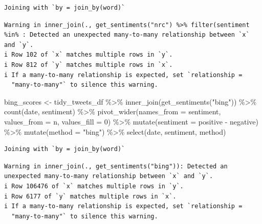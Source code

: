 \documentclass[
  letterpaper,
  DIV=11,
  numbers=noendperiod]{scrreprt}
\newenvironment{Shaded}{\begin{snugshade}}{\end{snugshade}}
\newcommand{\AttributeTok}[1]{\textcolor[rgb]{0.40,0.45,0.13}{#1}}
\newcommand{\DecValTok}[1]{\textcolor[rgb]{0.68,0.00,0.00}{#1}}
\newcommand{\FunctionTok}[1]{\textcolor[rgb]{0.28,0.35,0.67}{#1}}
\newcommand{\NormalTok}[1]{\textcolor[rgb]{0.00,0.23,0.31}{#1}}
\newcommand{\OtherTok}[1]{\textcolor[rgb]{0.00,0.23,0.31}{#1}}
\newcommand{\SpecialCharTok}[1]{\textcolor[rgb]{0.37,0.37,0.37}{#1}}
\newcommand{\StringTok}[1]{\textcolor[rgb]{0.13,0.47,0.30}{#1}}
\begin{document}
\begin{verbatim}
Joining with `by = join_by(word)`
\end{verbatim}

\begin{verbatim}
Warning in inner_join(., get_sentiments("nrc") %>% filter(sentiment %in% : Detected an unexpected many-to-many relationship between `x` and `y`.
i Row 102 of `x` matches multiple rows in `y`.
i Row 812 of `y` matches multiple rows in `x`.
i If a many-to-many relationship is expected, set `relationship =
  "many-to-many"` to silence this warning.
\end{verbatim}

\begin{Shaded}
\begin{Highlighting}[]
\NormalTok{bing\_scores }\OtherTok{\textless{}{-}}\NormalTok{ tidy\_tweets\_df }\SpecialCharTok{\%\textgreater{}\%}
  \FunctionTok{inner\_join}\NormalTok{(}\FunctionTok{get\_sentiments}\NormalTok{(}\StringTok{"bing"}\NormalTok{)) }\SpecialCharTok{\%\textgreater{}\%}
  \FunctionTok{count}\NormalTok{(date, sentiment) }\SpecialCharTok{\%\textgreater{}\%} 
   \FunctionTok{pivot\_wider}\NormalTok{(}\AttributeTok{names\_from =}\NormalTok{ sentiment,}
              \AttributeTok{values\_from =}\NormalTok{ n,}
              \AttributeTok{values\_fill =} \DecValTok{0}\NormalTok{) }\SpecialCharTok{\%\textgreater{}\%} 
  \FunctionTok{mutate}\NormalTok{(}\AttributeTok{sentiment =}\NormalTok{ positive }\SpecialCharTok{{-}}\NormalTok{ negative) }\SpecialCharTok{\%\textgreater{}\%} 
    \FunctionTok{mutate}\NormalTok{(}\AttributeTok{method =} \StringTok{"bing"}\NormalTok{) }\SpecialCharTok{\%\textgreater{}\%} 
  \FunctionTok{select}\NormalTok{(date, sentiment, method)}
\end{Highlighting}
\end{Shaded}

\begin{verbatim}
Joining with `by = join_by(word)`
\end{verbatim}

\begin{verbatim}
Warning in inner_join(., get_sentiments("bing")): Detected an unexpected many-to-many relationship between `x` and `y`.
i Row 106476 of `x` matches multiple rows in `y`.
i Row 6177 of `y` matches multiple rows in `x`.
i If a many-to-many relationship is expected, set `relationship =
  "many-to-many"` to silence this warning.
\end{verbatim}
\end{document}

